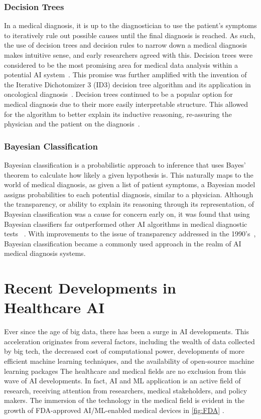 \documentclass[a4paper]{article}
\begin{document}
\subsubsection{Decision Trees}
In a medical diagnosis, it is up to the diagnostician to use the patient's symptoms to iteratively rule out possible causes until the final diagnosis is reached. As such, the use of decision trees and decision rules to narrow down a medical diagnosis makes intuitive sense, and early researchers agreed with this. Decision trees were considered to be the most promising area for medical data analysis within a potential AI system~\cite{kononenko_machine_2001}. This promise was further amplified with the invention of the Iterative Dichotomizer 3 (ID3) decision tree algorithm and its application in oncological diagnosis~\cite{kononenko_machine_2001}. Decision trees continued to be a popular option for medical diagnosis due to their more easily interpretable structure. This allowed for the algorithm to better explain its inductive reasoning, re-assuring the physician and the patient on the diagnosis~\cite{kononenko_machine_2001}. 

\subsubsection{Bayesian Classification}
Bayesian classification is a probabilistic approach to inference that uses Bayes' theorem to calculate how likely a given hypothesis is. This naturally maps to the world of medical diagnosis, as given a list of patient symptoms, a Bayesian model assigns probabilities to each potential diagnosis, similar to a physician. Although the transparency, or ability to explain its reasoning through its representation, of Bayesian classification was a cause for concern early on, it was found that using Bayesian classifiers far outperformed other AI algorithms in medical diagnostic tests~ \cite{kononenko_machine_2001}. With improvements to the issue of transparency addressed in the 1990's~\cite{kononenko_machine_2001}, Bayesian classification became a commonly used approach in the realm of AI medical diagnosis systems.  

\section{Recent Developments in Healthcare AI}
Ever since the age of big data, there has been a surge in AI developments. 
This acceleration originates from several factors, including the wealth of data collected by big tech, the decreased cost of computational power, developments of more efficient machine learning techniques, and the availability of open-source machine learning packages
The healthcare and medical fields are no exclusion from this wave of AI developments. 
In fact, AI and ML application is an active field of research, receiving attention from researchers, medical stakeholders, and policy makers.
The immersion of the technology in the medical field is evident in the growth of FDA-approved AI/ML-enabled medical devices in \autoref{fig:FDA} \cite{FDA_artificial_nodate}.
\end{document}
